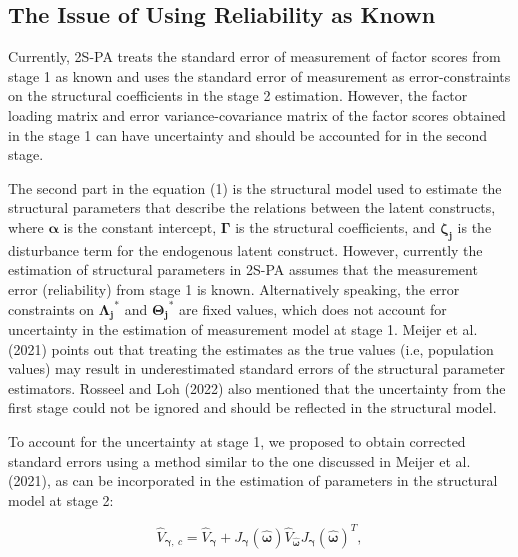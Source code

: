 \documentclass[
  man]{apa6}
\begin{document}
\hypertarget{the-issue-of-using-reliability-as-known}{%
\subsection{The Issue of Using Reliability as Known}\label{the-issue-of-using-reliability-as-known}}

Currently, 2S-PA treats the standard error of measurement of factor scores from stage 1 as known and uses the standard error of measurement as error-constraints on the structural coefficients in the stage 2 estimation. However, the factor loading matrix and error variance-covariance matrix of the factor scores obtained in the stage 1 can have uncertainty and should be accounted for in the second stage.

The second part in the equation (1) is the structural model used to estimate the structural parameters that describe the relations between the latent constructs, where \(\boldsymbol{\alpha}\) is the constant intercept, \(\boldsymbol{\Gamma}\) is the structural coefficients, and \(\boldsymbol{\zeta_{j}}\) is the disturbance term for the endogenous latent construct. However, currently the estimation of structural parameters in 2S-PA assumes that the measurement error (reliability) from stage 1 is known. Alternatively speaking, the error constraints on \(\boldsymbol{\Lambda_{j}}^\text{*}\) and \(\boldsymbol{\Theta_{j}}^\text{*}\) are fixed values, which does not account for uncertainty in the estimation of measurement model at stage 1. Meijer et al. (2021) points out that treating the estimates as the true values (i.e, population values) may result in underestimated standard errors of the structural parameter estimators. Rosseel and Loh (2022) also mentioned that the uncertainty from the first stage could not be ignored and should be reflected in the structural model.

To account for the uncertainty at stage 1, we proposed to obtain corrected standard errors using a method similar to the one discussed in Meijer et al. (2021), as can be incorporated in the estimation of parameters in the structural model at stage 2:

\begin{equation}
\hat{V}_{\boldsymbol{\gamma},\ c} = \hat{V}_{\boldsymbol{\gamma}} + J_{\boldsymbol{\gamma}}(\hat{\boldsymbol{\omega}})\hat{V}_{\boldsymbol{\hat{\boldsymbol{\omega}}}}J_{\boldsymbol{\gamma}}(\hat{\boldsymbol{\omega}})^T,
\end{equation}
\end{document}
